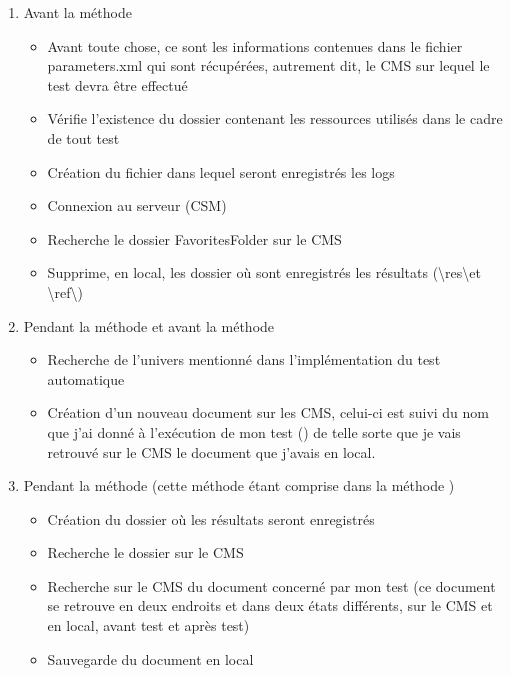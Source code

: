 \begin{enumerate}
	\item Avant la m\'{e}thode 
	\begin{itemize}
		\item Avant toute chose, ce sont les informations contenues dans le fichier parameters.xml qui sont r\'{e}cup\'{e}r\'{e}es, autrement dit, le \gls{CMS} sur lequel le test devra \^{e}tre effectu\'{e}
		\item V\'{e}rifie l'existence du dossier contenant les ressources utilis\'{e}s dans le cadre de tout test
		\item Cr\'{e}ation du fichier dans lequel seront enregistr\'{e}s les logs 
		\item Connexion au serveur (CSM)
		\item Recherche le dossier FavoritesFolder sur le \gls{CMS}
		\item Supprime, en local, les dossier o\`{u} sont enregistr\'{e}s les r\'{e}sultats (\textbackslash res\textbackslash  et \textbackslash ref\textbackslash )
		
	\end{itemize}
	\item Pendant la m\'{e}thode  et avant la m\'{e}thode 
	\begin{itemize}
		\item Recherche de l'univers mentionn\'{e} dans l'impl\'{e}mentation du test automatique
		\item Cr\'{e}ation d'un nouveau document sur les \gls{CMS}, celui-ci est suivi du nom que j'ai donn\'{e} \`{a} l'ex\'{e}cution de mon test () de telle sorte que je vais retrouv\'{e} sur le \gls{CMS} le document que j'avais en local.
	\end{itemize}
	\item Pendant la m\'{e}thode  (cette m\'{e}thode \'{e}tant comprise dans la m\'{e}thode )
	\begin{itemize}
		\item Cr\'{e}ation du dossier o\`{u} les r\'{e}sultats seront enregistr\'{e}s
		\item Recherche le dossier  sur le \gls{CMS}
		\item Recherche sur le \gls{CMS} du document concern\'{e} par mon test (ce document se retrouve en deux endroits et dans deux \'{e}tats diff\'{e}rents, sur le \gls{CMS} et en local, avant test et apr\`{e}s test)
		\item Sauvegarde du document en local
		

\end{itemize}
\end{enumerate}
